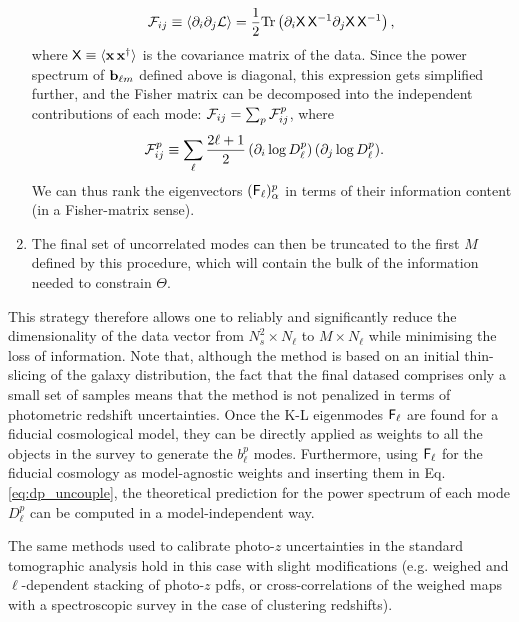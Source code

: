 \documentclass[twocolumn,amsfont,amssymb,amsmath, showpacs,balancelastpage, nofootinbib]{revtex4-1}
\begin{document}
\begin{enumerate}
        \begin{equation}
          {\cal F}_{ij}\equiv\left\langle\partial_i\partial_j{\cal L}\right\rangle=\frac{1}{2}{\rm Tr}\left(\partial_i{\sf X}\,{\sf X}^{-1}\partial_j{\sf X}\,{\sf X}^{-1}\right),
        \end{equation}
        where ${\sf X}\equiv\langle {\bf x}\,{\bf x}^\dag\rangle$ is the covariance matrix of the data. Since the power spectrum of ${\bf b}_{\ell m}$ defined above is diagonal, this expression gets simplified further, and the Fisher matrix can be decomposed into the independent contributions of each mode: ${\cal F}_{ij}=\sum_p {\cal F}^p_{ij}$, where
        \begin{align}
          {\cal F}^p_{ij}&\equiv\sum_\ell\frac{2\ell+1}{2}\,(\partial_i\log D^p_\ell)\,(\partial_j\log D^p_\ell).
        \end{align}
        We can thus rank the eigenvectors $({\sf F}_\ell)^p_\alpha$ in terms of their information content (in a Fisher-matrix sense).
        \item The final set of uncorrelated modes can then be truncated to the first $M$ defined by this procedure, which will contain the bulk of the information needed to constrain $\Theta$.
    \end{enumerate}
    This strategy therefore allows one to reliably and significantly reduce the dimensionality of the data vector from $N_s^2\times N_\ell$ to $M\times N_\ell$ while minimising the loss of information. Note that, although the method is based on an initial thin-slicing of the galaxy distribution, the fact that the final datased comprises only a small set of samples means that the method is not penalized in terms of photometric redshift uncertainties. Once the K-L eigenmodes ${\sf F}_\ell$ are found for a fiducial cosmological model, they can be directly applied as weights to all the objects in the survey to generate the $b^p_\ell$ modes. Furthermore, using ${\sf F}_\ell$ for the fiducial cosmology as model-agnostic weights and inserting them in Eq. \ref{eq:dp_uncouple}, the theoretical prediction for the power spectrum of each mode $D^p_\ell$ can be computed in a model-independent way.
    
    The same methods used to calibrate photo-$z$ uncertainties in the standard tomographic analysis hold in this case with slight modifications (e.g. weighed and $\ell$-dependent stacking of photo-$z$ pdfs, or cross-correlations of the weighed maps with a spectroscopic survey in the case of clustering redshifts).
\end{document}
